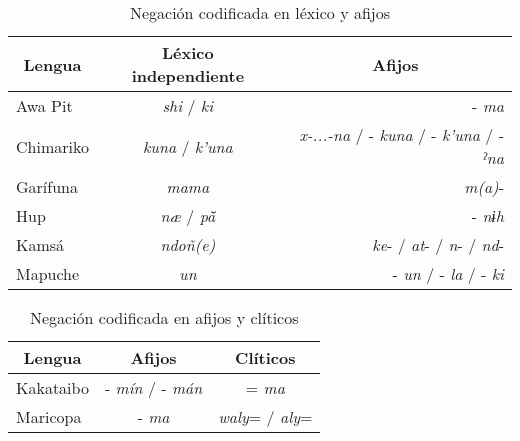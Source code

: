 \begin{table}[htbp]
\centering
\begin{tabular}{lcr}
\multicolumn{1}{c}{\textbf{Lengua}} & \textbf{Léxico independiente} & \multicolumn{1}{c}{\textbf{Afijos}} \\
\hline
Awa Pit & {\setmainfont{Charis SIL} \textit{shi}} / {\setmainfont{Charis SIL} \textit{ki}} & -{\setmainfont{Charis SIL} \textit{ma}} \\
Chimariko & {\setmainfont{Charis SIL} \textit{kuna}} / {\setmainfont{Charis SIL} \textit{k’una}} & {\setmainfont{Charis SIL} \textit{x-...-na}} / -{\setmainfont{Charis SIL} \textit{kuna}} / -{\setmainfont{Charis SIL} \textit{k’una}} / -{\setmainfont{Charis SIL} \textit{ˀna}} \\
Garífuna & {\setmainfont{Charis SIL} \textit{mama}}  & {\setmainfont{Charis SIL} \textit{m(a)}}-  \\
Hup   & {\setmainfont{Charis SIL} \textit{næ}} / {\setmainfont{Charis SIL} \textit{pā̌}} & -{\setmainfont{Charis SIL} \textit{nɨh}} \\
Kamsá & {\setmainfont{Charis SIL} \textit{ndoñ(e)}} & {\setmainfont{Charis SIL} \textit{ke}}- / {\setmainfont{Charis SIL} \textit{at}}- / {\setmainfont{Charis SIL} \textit{n}}- / {\setmainfont{Charis SIL} \textit{nd}}- \\
Mapuche & {\setmainfont{Charis SIL} \textit{un}}    & -{\setmainfont{Charis SIL} \textit{un}} / -{\setmainfont{Charis SIL} \textit{la}} / -{\setmainfont{Charis SIL} \textit{ki}} \\
\hline
\end{tabular}
\caption{Negación codificada en léxico y afijos}
\label{cuadro9}
\end{table}

\begin{table}[htbp]
\centering
\begin{tabular}{lcc}
\multicolumn{1}{c}{\textbf{Lengua}} & \textbf{Afijos} & \textbf{Clíticos} \\
\hline
Kakataibo & -{\setmainfont{Charis SIL} \textit{mín}} / -{\setmainfont{Charis SIL} \textit{mán}} & ={\setmainfont{Charis SIL} \textit{ma}} \\
Maricopa & -{\setmainfont{Charis SIL} \textit{ma}}   & {\setmainfont{Charis SIL} \textit{waly}}= / {\setmainfont{Charis SIL} \textit{aly}}= \\
\hline
\end{tabular}
\caption{Negación codificada en afijos y clíticos}
\label{cuadro10}
\end{table}
  
